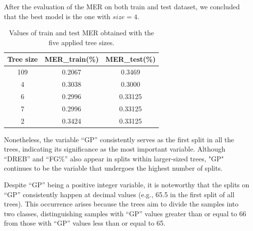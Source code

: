 After the evaluation of the MER on both train and test dataset, we concluded that the best model is the one with $size = 4$.

\begin{table}[h]
	\centering
	\begin{tabular}{|| c | c | c ||}
		\hline 
		Tree size & MER\_train(\%) & MER\_test(\%) \\
		\hline
		\hline
		109 & 0.2067 & 0.3469 \\
		\hline
		4 & 0.3038 & 0.3000 \\
		\hline
		6 & 0.2996 & 0.33125 \\
		\hline
		7 & 0.2996 & 0.33125 \\
		\hline
		2 & 0.3424 & 0.33125 \\
		\hline
	\end{tabular}
	\caption{Values of train and test MER obtained with the five applied tree sizes.}
\end{table} 

Nonetheless, the variable ``GP'' consistently serves as the first split in all the trees, indicating its significance as the most important variable. Although ``DREB'' and ``FG\%'' also appear in splits within larger-sized trees, "GP" continues to be the variable that undergoes the highest number of splits.

Despite ``GP'' being a positive integer variable, it is noteworthy that the splits on ``GP'' consistently happen at decimal values (e.g., 65.5 in the first split of all trees). This occurrence arises because the trees aim to divide the samples into two classes, distinguishing samples with ``GP'' values greater than or equal to 66 from those with ``GP'' values less than or equal to 65.
